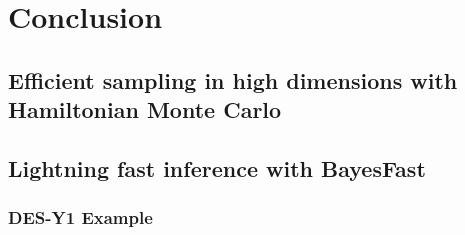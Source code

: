 \documentclass[final,5p,times,twocolumn,authoryear]{elsarticle}
\begin{document}
\section{Conclusion}


\subsection{Efficient sampling in high dimensions with Hamiltonian Monte Carlo}



\subsection{Lightning fast inference with BayesFast}

%
%
\subsubsection{DES-Y1 Example}
%



\appendix
\end{document}

